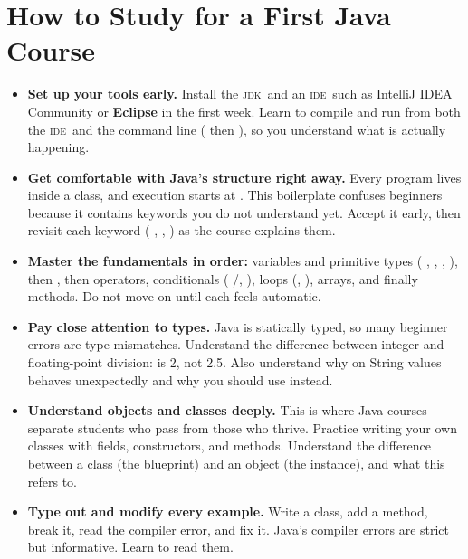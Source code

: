 \documentclass[%
 reprint,
 amsmath,amssymb,
 aps,
]{revtex4-2}
\newcommand{\JDK}{\textsc{jdk}}
\newcommand{\IDE}{\textsc{ide}}
\begin{document}
\section{How to Study for a First Java Course}

	
\begin{itemize}

	\item
	\textbf{Set up your tools early.} 
	Install the \JDK\ and an \IDE\ such as IntelliJ IDEA Community or \textbf{Eclipse} in the first week. 
	Learn to compile and run from both the \IDE\ and the command line 
	( then ), 
	so you understand what is actually happening.
	
	\item
	\textbf{Get comfortable with Java’s structure right away.} 
	Every program lives inside a class, and execution starts at 
	. 
	This boilerplate confuses beginners because it contains keywords you do not understand yet. 
	Accept it early, then revisit each keyword (
	, 
	, 
	) as the course explains them.
	
	\item
	\textbf{Master the fundamentals in order:} 
	variables and primitive types (
	, 
	, 
	, 
	), then 
	, then operators, 
	conditionals (
	/, 
	), 
	loops (, ), 
	arrays, and finally methods. 
	Do not move on until each feels automatic.
	
	\item
	\textbf{Pay close attention to types.} 
	Java is statically typed, so many beginner errors are type mismatches. 
	Understand the difference between integer and floating-point division: 
	 is 2, not 2.5. 
	Also understand why \code{==} on String values behaves unexpectedly and 
	why you should use 
	 instead.
	
	\item
	\textbf{Understand objects and classes deeply.} 
	This is where Java courses separate students who pass from those who thrive. 
	Practice writing your own classes with fields, constructors, and methods. 
	Understand the difference between a class (the blueprint) and an object (the instance), and 
	what this refers to.
	
	\item
	\textbf{Type out and modify every example.} 
	Write a class, add a method, break it, read the compiler error, and fix it. 
	Java’s compiler errors are strict but informative. Learn to read them.
	

\end{itemize}
\end{document}
